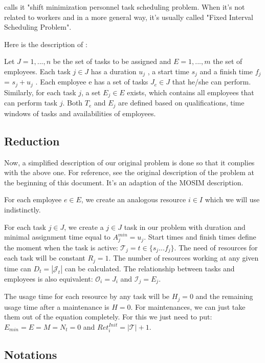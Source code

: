 \documentclass[a4paper,11pt]{article}
\begin{document}
    \cite{Smet2015} calls it "shift minimization personnel task scheduling problem. When it's not related to workers and in a more general way, it's usually called "Fixed Interval Scheduling Problem".

    Here is the description of \cite{Smet2015}:

    Let $J = {1, ..., n}$ be the set of tasks to be assigned and $E = {1, ..., m}$ the set of employees. Each task $j \in J$ has a duration $u_j$ , a start time $s_j$ and a finish time $f_j$ = $s_j + u_j$ . Each employee e has a set of tasks $J_e \in J$ that he/she can perform. Similarly, for each task $j$, a set $E_j \in E$ exists, which contains all employees that can perform task $j$. Both $T_e$ and $E_j$ are defined based on qualifications, time windows of tasks and availabilities of employees.

    \subsection{Reduction}

    Now, a simplified description of our original problem is done so that it complies with the above one. For reference, see the original description of the problem at the beginning of this document. It's an adaption of the MOSIM description.

    For each employee $e \in E$, we create an analogous resource $i \in I$ which we will use indistinctly. 

    For each task $j \in J$, we create a $j \in J$ task in our problem with duration and minimal assignment time equal to $A^{min}_j = u_j$. Start times and finish times define the moment when the task is active: $\mathcal{T}_j = t \in \{s_j ... f_j\}$. The need of resources for each task will be constant $R_{j} = 1$. The number of resources working at any given time can $D_t = |\mathcal{J}_t|$ can be calculated. The relationship between tasks and employees is also equivalent: $\mathcal{O}_i = J_i$ and $\mathcal{I}_j = E_j$.

    The usage time for each resource by any task will be $H_j = 0$ and the remaining usage time after a maintenance is $H = 0$.
    For maintenances, we can just take them out of the equation completely. For this we just need to put: $E_{min} = E = M = N_t = 0$ and $Ret^{Init}_{i} = |\mathcal{T}| + 1$.

    \subsection{Notations}
\end{document}
